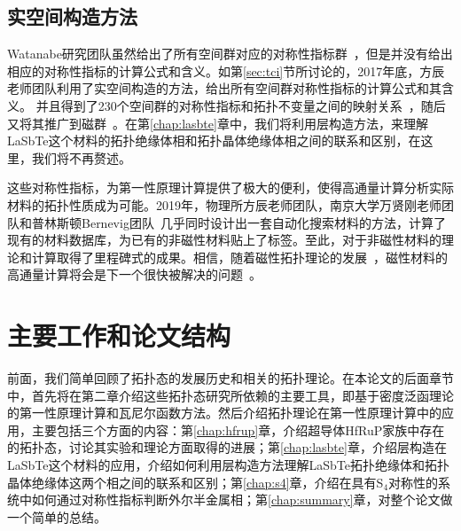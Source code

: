 \subsection{实空间构造方法}
Watanabe研究团队虽然给出了所有空间群对应的对称性指标群~\citep{nc_ashvin}，但是并没有给出相应的对称性指标的计算公式和含义。如第\ref{sec:tci}节所讨论的，2017年底，方辰老师团队利用了实空间构造的方法，给出所有空间群对称性指标的计算公式和其含义。
并且得到了230个空间群的对称性指标和拓扑不变量之间的映射关系~\citep{song2017}，随后又将其推广到磁群~\citep{Peng2021}。在第\ref{chap:lasbte}章中，我们将利用层构造方法，来理解LaSbTe这个材料的拓扑绝缘体相和拓扑晶体绝缘体相之间的联系和区别，在这里，我们将不再赘述。

这些对称性指标，为第一性原理计算提供了极大的便利，使得高通量计算分析实际材料的拓扑性质成为可能。2019年，物理所方辰老师团队，南京大学万贤刚老师团队和普林斯顿Bernevig团队~\citep{zhang2019,wanxg2019,Vergniory2019}几乎同时设计出一套自动化搜索材料的方法，计算了现有的材料数据库，为已有的非磁性材料贴上了标签。至此，对于非磁性材料的理论和计算取得了里程碑式的成果。相信，随着磁性拓扑理论的发展~\citep{Watanabe2018,Elcoro2020,Peng2021}，磁性材料的高通量计算将会是下一个很快被解决的问题~\citep{xuyf2020}。

\section{主要工作和论文结构}\label{sec:structure}
前面，我们简单回顾了拓扑态的发展历史和相关的拓扑理论。在本论文的后面章节中，首先将在第二章介绍这些拓扑态研究所依赖的主要工具，即基于密度泛函理论的第一性原理计算和瓦尼尔函数方法。然后介绍拓扑理论在第一性原理计算中的应用，主要包括三个方面的内容：第\ref{chap:hfrup}章，介绍超导体HfRuP家族中存在的拓扑态，讨论其实验和理论方面取得的进展；第\ref{chap:lasbte}章，介绍层构造在LaSbTe这个材料的应用，介绍如何利用层构造方法理解LaSbTe拓扑绝缘体和拓扑晶体绝缘体这两个相之间的联系和区别；第\ref{chap:s4}章，介绍在具有S$_4$对称性的系统中如何通过对称性指标判断外尔半金属相；第\ref{chap:summary}章，对整个论文做一个简单的总结。








